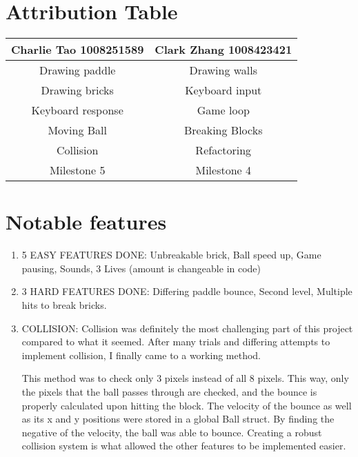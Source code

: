 \documentclass{article}
\begin{document}
\section{Attribution Table}

\begin{center}
\begin{tabular}{|| c | c ||}
\hline
 Charlie Tao 1008251589 &  Clark Zhang 1008423421 \\ 
 \hline
 Drawing paddle & Drawing walls\\
 \hline
 Drawing bricks & Keyboard input\\
 \hline
 Keyboard response & Game loop\\ 
 \hline
 Moving Ball & Breaking Blocks\\ 
 \hline
 Collision & Refactoring\\
 \hline
 Milestone 5 & Milestone 4\\  
 \hline
\end{tabular}
\end{center}

\section{Notable features}

\begin{enumerate}
    \item 5 EASY FEATURES DONE: Unbreakable brick, Ball speed up, Game pausing, Sounds, 3 Lives (amount is changeable in code)
    \item 3 HARD FEATURES DONE: Differing paddle bounce, Second level, Multiple hits to break bricks.
    \item COLLISION: Collision was definitely the most challenging part of this project compared to what it seemed. After many trials and differing attempts to implement collision, I finally came to a working method. 
    
    This method was to check only 3 pixels instead of all 8 pixels. This way, only the pixels that the ball passes through are checked, and the bounce is properly calculated upon hitting the block. The velocity of the bounce as well as its x and y positions were stored in a global Ball struct. By finding the negative of the velocity, the ball was able to bounce. Creating a robust collision system is what allowed the other features to be implemented easier. 
    
\end{enumerate} 
\end{document}
